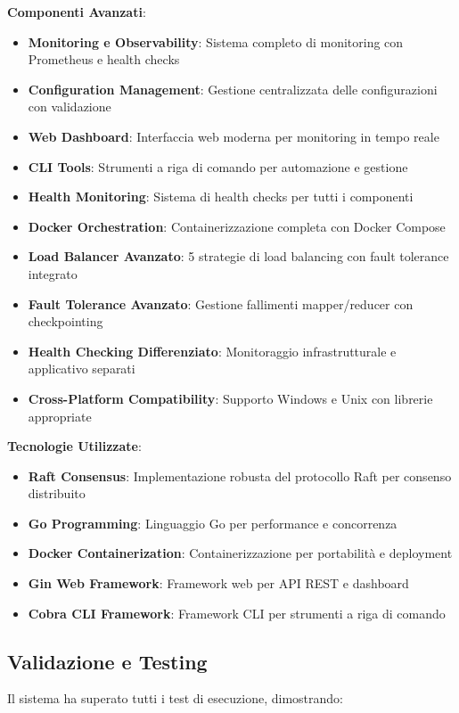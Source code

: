 \documentclass[12pt,a4paper]{article}
\begin{document}
\textbf{Componenti Avanzati}:
\begin{itemize}
\item \textbf{Monitoring e Observability}: Sistema completo di monitoring con Prometheus e health checks
\item \textbf{Configuration Management}: Gestione centralizzata delle configurazioni con validazione
\item \textbf{Web Dashboard}: Interfaccia web moderna per monitoring in tempo reale
\item \textbf{CLI Tools}: Strumenti a riga di comando per automazione e gestione
\item \textbf{Health Monitoring}: Sistema di health checks per tutti i componenti
\item \textbf{Docker Orchestration}: Containerizzazione completa con Docker Compose
\item \textbf{Load Balancer Avanzato}: 5 strategie di load balancing con fault tolerance integrato
\item \textbf{Fault Tolerance Avanzato}: Gestione fallimenti mapper/reducer con checkpointing
\item \textbf{Health Checking Differenziato}: Monitoraggio infrastrutturale e applicativo separati
\item \textbf{Cross-Platform Compatibility}: Supporto Windows e Unix con librerie appropriate
\end{itemize}

\textbf{Tecnologie Utilizzate}:
\begin{itemize}
\item \textbf{Raft Consensus}: Implementazione robusta del protocollo Raft per consenso distribuito
\item \textbf{Go Programming}: Linguaggio Go per performance e concorrenza
\item \textbf{Docker Containerization}: Containerizzazione per portabilità e deployment
\item \textbf{Gin Web Framework}: Framework web per API REST e dashboard
\item \textbf{Cobra CLI Framework}: Framework CLI per strumenti a riga di comando
\end{itemize}

\subsection{Validazione e Testing}

Il sistema ha superato tutti i test di esecuzione, dimostrando:
\end{document}
